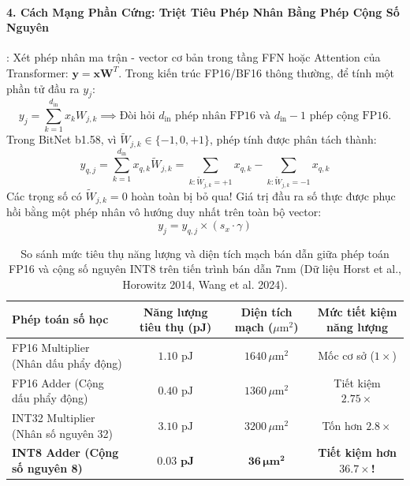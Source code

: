 \paragraph{4. Cách Mạng Phần Cứng: Triệt Tiêu Phép Nhân Bằng Phép Cộng Số Nguyên}:
Xét phép nhân ma trận - vector cơ bản trong tầng FFN hoặc Attention của Transformer: $\mathbf{y} = \mathbf{x} \mathbf{W}^T$.
Trong kiến trúc FP16/BF16 thông thường, để tính một phần tử đầu ra $y_j$:
\begin{equation}
y_j = \sum_{k=1}^{d_{\text{in}}} x_k W_{j,k} \implies \text{Đòi hỏi } d_{\text{in}} \text{ phép nhân FP16 và } d_{\text{in}}-1 \text{ phép cộng FP16.}
\end{equation}
Trong BitNet b1.58, vì $\widetilde{W}_{j,k} \in \{-1, 0, +1\}$, phép tính được phân tách thành:
\begin{equation}
\label{eq:bitnet-pure-additions}
y_{q, j} = \sum_{k=1}^{d_{\text{in}}} x_{q, k} \widetilde{W}_{j,k} = \sum_{k: \widetilde{W}_{j,k} = +1} x_{q, k} - \sum_{k: \widetilde{W}_{j,k} = -1} x_{q, k}
\end{equation}
Các trọng số có $\widetilde{W}_{j,k} = 0$ hoàn toàn bị bỏ qua!
Giá trị đầu ra số thực được phục hồi bằng một phép nhân vô hướng duy nhất trên toàn bộ vector:
\begin{equation}
y_j = y_{q, j} \times (s_x \cdot \gamma)
\end{equation}

\begin{table}[ht]
\centering
\footnotesize
\caption{So sánh mức tiêu thụ năng lượng và diện tích mạch bán dẫn giữa phép toán FP16 và cộng số nguyên INT8 trên tiến trình bán dẫn 7nm (Dữ liệu Horst et al., Horowitz 2014, Wang et al. 2024).}
\label{tab:bitnet-energy-comparison}
\begin{tabular}{lccc}
\toprule
\textbf{Phép toán số học} & \textbf{Năng lượng tiêu thụ (pJ)} & \textbf{Diện tích mạch ($\mu\text{m}^2$)} & \textbf{Mức tiết kiệm năng lượng} \\
\midrule
FP16 Multiplier (Nhân dấu phẩy động) & $1.10\text{ pJ}$ & $1640\,\mu\text{m}^2$ & Mốc cơ sở ($1\times$) \\
FP16 Adder (Cộng dấu phẩy động)      & $0.40\text{ pJ}$ & $1360\,\mu\text{m}^2$ & Tiết kiệm $2.75\times$ \\
INT32 Multiplier (Nhân số nguyên 32) & $3.10\text{ pJ}$ & $3200\,\mu\text{m}^2$ & Tốn hơn $2.8\times$ \\
\textbf{INT8 Adder (Cộng số nguyên 8)}& $\mathbf{0.03\text{ pJ}}$ & $\mathbf{36\,\mu\text{m}^2}$ & \textbf{Tiết kiệm hơn $36.7\times$!} \\
\bottomrule
\end{tabular}
\end{table}


